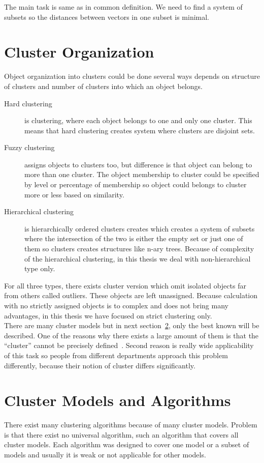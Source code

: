 The main task is same as in common definition. We need to find a system of subsets so the distances between vectors in one subset is minimal.

\section{Cluster Organization} \label{sec:clusterorganization}
Object organization into clusters could be done several ways depends on structure of clusters and number of clusters into which an object belongs.
\begin{description}
\item[Hard clustering] is clustering, where each object belongs to one and only one cluster. This means that hard clustering creates system where clusters are disjoint sets.
\item[Fuzzy clustering] assigns objects to clusters too, but difference is that object can belong to more than one cluster. The object membership to cluster could be specified by level or percentage of membership so object could belongs to cluster more or less based on similarity.
\item[Hierarchical clustering] is hierarchically ordered clusters creates which creates a system of subsets where the intersection of the two is either the empty set or just one of them so clusters creates structures like n-ary trees. Because of complexity of the hierarchical clustering, in this thesis we deal with non-hierarchical type only.
\end{description}
For all three types, there exists cluster version which omit isolated objects far from others called outliers. These objects are left unassigned. Because calculation with no strictly assigned objects is to complex and does not bring many advantages, in this thesis we have focused on strict clustering only.\\

There are many cluster models but in next section~\ref{sec:clustermodels}, only the best known will be described. One of the reasons why there exists a large amount of them is that the ``cluster'' cannot be precisely defined~\cite{EstivillCastro02}. Second reason is really wide applicability of this task so people from different departments approach this problem differently, because their notion of cluster differs significantly. \\

\section{Cluster Models and Algorithms} \label{sec:clustermodels}
There exist many clustering algorithms because of many cluster models. Problem is that there exist no universal algorithm, such an algorithm that covers all cluster models. Each algorithm was designed to cover one model or a subset of models and usually it is weak or not applicable for other models.

